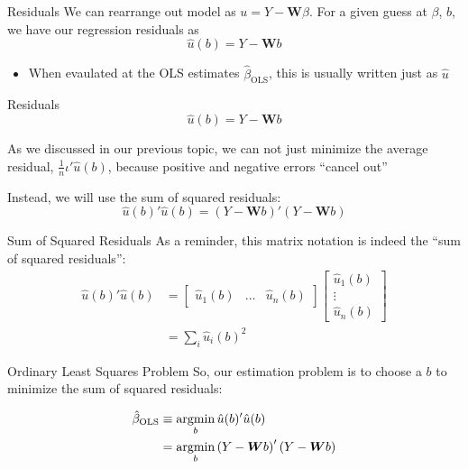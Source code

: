 \documentclass[aspectratio=169,t,11pt,table]{beamer}
\begin{document}
\begin{frame}{Residuals}
  We can rearrange out model as $u = Y - \bm{W} \beta$. For a given guess at $\beta$, $b$, we have our regression residuals as
  $$
    \hat{u}(b) = Y - \bm{W} b
  $$
  \vspace*{-\bigskipamount}
  \begin{itemize}
    \item When evaulated at the OLS estimates $\hat{\beta}_{\text{OLS}}$, this is usually written just as $\hat{u}$
  \end{itemize}
\end{frame}

\begin{frame}{Residuals}
  \vspace*{-\bigskipamount}
  $$
    \hat{u}(b) = Y - \bm{W} b
  $$

  As we discussed in our previous topic, we can not just minimize the average residual, $\frac{1}{n} \iota' \hat{u}(b)$, because positive and negative errors ``cancel out''
  
  \pause
  \bigskip
  Instead, we will use the sum of squared residuals:
  $$
    \hat{u}(b)' \hat{u}(b) = 
    \left(Y - \bm{W} b \right)' \left( Y - \bm{W} b \right)
  $$
\end{frame}

\begin{frame}{Sum of Squared Residuals}
  As a reminder, this matrix notation is indeed the ``sum of squared residuals'': 
  \begin{align*}
    \hat{u}(b)' \hat{u}(b) 
    &= 
    \begin{bmatrix}
      \hat{u}_1(b) & \dots & \hat{u}_n(b)
    \end{bmatrix}
    \begin{bmatrix}
      \hat{u}_1(b) \\ \vdots \\ \hat{u}_n(b)
    \end{bmatrix} \\
    &= \sum_i \hat{u}_i(b)^2
  \end{align*}
\end{frame}

\begin{frame}{Ordinary Least Squares Problem}
  So, our estimation problem is to choose a $b$ to minimize the sum of squared residuals:  

  \begin{align*}
    \hat{\beta}_{\text{OLS}} 
    &\equiv \operatorname*{argmin}_b \hat{u}(b)' \hat{u}(b) \\
    &= \operatorname*{argmin}_b  \left(Y - \bm{W} b \right)' \left( Y - \bm{W} b \right)
  \end{align*}
\end{frame}
\end{document}
